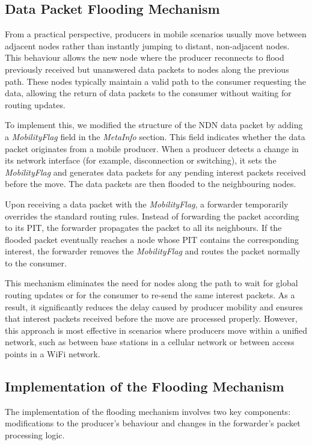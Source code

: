 \documentclass[conference]{IEEEtran}
\begin{document}
\subsection{Data Packet Flooding Mechanism}
From a practical perspective, producers in mobile scenarios usually move between adjacent nodes rather than instantly jumping to distant, non-adjacent nodes. This behaviour allows the new node where the producer reconnects to flood previously received but unanswered data packets to nodes along the previous path. These nodes typically maintain a valid path to the consumer requesting the data, allowing the return of data packets to the consumer without waiting for routing updates.

To implement this, we modified the structure of the NDN data packet by adding a \textit{MobilityFlag} field in the \textit{MetaInfo} section. This field indicates whether the data packet originates from a mobile producer. When a producer detects a change in its network interface (for example, disconnection or switching), it sets the \textit{MobilityFlag} and generates data packets for any pending interest packets received before the move. The data packets are then flooded to the neighbouring nodes.

Upon receiving a data packet with the \textit{MobilityFlag}, a forwarder temporarily overrides the standard routing rules. Instead of forwarding the packet according to its PIT, the forwarder propagates the packet to all its neighbours. If the flooded packet eventually reaches a node whose PIT contains the corresponding interest, the forwarder removes the \textit{MobilityFlag} and routes the packet normally to the consumer.

This mechanism eliminates the need for nodes along the path to wait for global routing updates or for the consumer to re-send the same interest packets. As a result, it significantly reduces the delay caused by producer mobility and ensures that interest packets received before the move are processed properly. However, this approach is most effective in scenarios where producers move within a unified network, such as between base stations in a cellular network or between access points in a WiFi network.

\subsection{Implementation of the Flooding Mechanism}
The implementation of the flooding mechanism involves two key components: modifications to the producer's behaviour and changes in the forwarder's packet processing logic.
\end{document}
